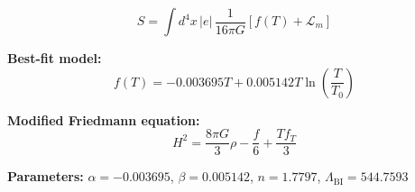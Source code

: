 
\begin{equation}
  S = \int d^4x \, |e| \, \frac{1}{16\pi G} \left[ f(T) + \mathcal{L}_m \right]
\end{equation}

\textbf{Best-fit model:}
\begin{equation}
  f(T) = -0.003695 T + 0.005142 T \ln\!\left(\frac{T}{T_0}\right)
\end{equation}

\textbf{Modified Friedmann equation:}
\begin{equation}
  H^2 = \frac{8\pi G}{3} \rho - \frac{f}{6} + \frac{T f_T}{3}
\end{equation}

\textbf{Parameters:}
$\alpha = -0.003695$, \quad
$\beta = 0.005142$, \quad
$n = 1.7797$, \quad
$\Lambda_{\text{BI}} = 544.7593$